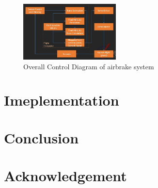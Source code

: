 \documentclass[conference, letterpaper]{IEEEtran}
\begin{document}
\begin{figure}[H]
\centering
\includegraphics[width=0.45\textwidth]{./MPC_diagram}
\caption{Overall Control Diagram of airbrake system}
\label{fig:MPC_diagram}
\end{figure}

\section{Imeplementation}

\section{Conclusion}

\section{Acknowledgement}



\end{document}
